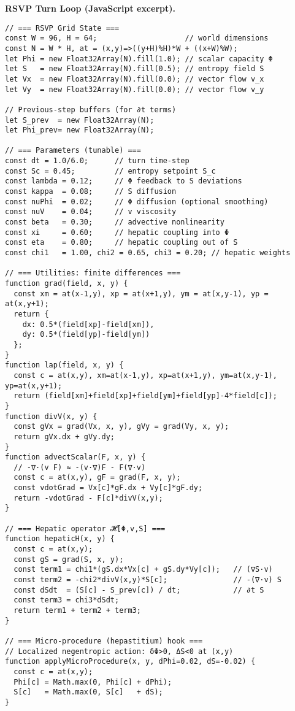 \documentclass[12pt]{article}
\begin{document}
\noindent\textbf{RSVP Turn Loop (JavaScript excerpt).}
\begin{verbatim}
// === RSVP Grid State ===
const W = 96, H = 64;                    // world dimensions
const N = W * H, at = (x,y)=>((y+H)%H)*W + ((x+W)%W);
let Phi = new Float32Array(N).fill(1.0); // scalar capacity Φ
let S   = new Float32Array(N).fill(0.5); // entropy field S
let Vx  = new Float32Array(N).fill(0.0); // vector flow v_x
let Vy  = new Float32Array(N).fill(0.0); // vector flow v_y

// Previous-step buffers (for ∂t terms)
let S_prev  = new Float32Array(N);
let Phi_prev= new Float32Array(N);

// === Parameters (tunable) ===
const dt = 1.0/6.0;      // turn time-step
const Sc = 0.45;         // entropy setpoint S_c
const lambda = 0.12;     // Φ feedback to S deviations
const kappa  = 0.08;     // S diffusion
const nuPhi  = 0.02;     // Φ diffusion (optional smoothing)
const nuV    = 0.04;     // v viscosity
const beta   = 0.30;     // advective nonlinearity
const xi     = 0.60;     // hepatic coupling into Φ
const eta    = 0.80;     // hepatic coupling out of S
const chi1   = 1.00, chi2 = 0.65, chi3 = 0.20; // hepatic weights

// === Utilities: finite differences ===
function grad(field, x, y) {
  const xm = at(x-1,y), xp = at(x+1,y), ym = at(x,y-1), yp = at(x,y+1);
  return {
    dx: 0.5*(field[xp]-field[xm]),
    dy: 0.5*(field[yp]-field[ym])
  };
}
function lap(field, x, y) {
  const c = at(x,y), xm=at(x-1,y), xp=at(x+1,y), ym=at(x,y-1), yp=at(x,y+1);
  return (field[xm]+field[xp]+field[ym]+field[yp]-4*field[c]);
}
function divV(x, y) {
  const gVx = grad(Vx, x, y), gVy = grad(Vy, x, y);
  return gVx.dx + gVy.dy;
}
function advectScalar(F, x, y) {
  // -∇·(v F) ≈ -(v·∇)F - F(∇·v)
  const c = at(x,y), gF = grad(F, x, y);
  const vdotGrad = Vx[c]*gF.dx + Vy[c]*gF.dy;
  return -vdotGrad - F[c]*divV(x,y);
}

// === Hepatic operator 𝓗[Φ,v,S] ===
function hepaticH(x, y) {
  const c = at(x,y);
  const gS = grad(S, x, y);
  const term1 = chi1*(gS.dx*Vx[c] + gS.dy*Vy[c]);   // (∇S·v)
  const term2 = -chi2*divV(x,y)*S[c];               // -(∇·v) S
  const dSdt  = (S[c] - S_prev[c]) / dt;            // ∂t S
  const term3 = chi3*dSdt;
  return term1 + term2 + term3;
}

// === Micro-procedure (hepastitium) hook ===
// Localized negentropic action: δΦ>0, ΔS<0 at (x,y)
function applyMicroProcedure(x, y, dPhi=0.02, dS=-0.02) {
  const c = at(x,y);
  Phi[c] = Math.max(0, Phi[c] + dPhi);
  S[c]   = Math.max(0, S[c]   + dS);
}


\end{verbatim}
\end{document}
